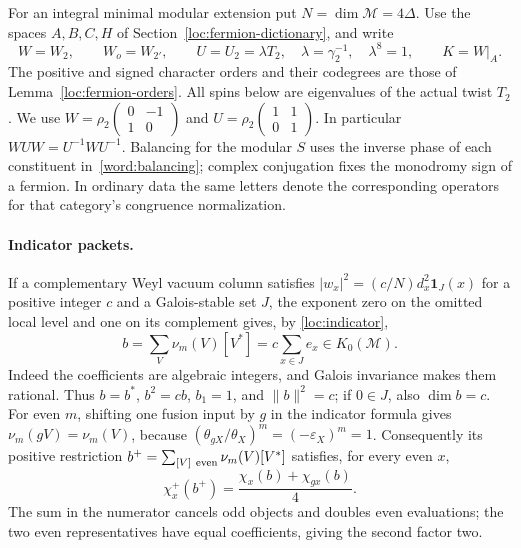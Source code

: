 \documentclass[11pt,a4paper]{article}
\numberwithin{equation}{section}
\begin{document}
For an integral minimal modular extension put $N=\dim\mathcal M=4\Delta$.
Use the spaces $A,B,C,H$ of Section~\ref{loc:fermion-dictionary}, and write
\[
 W=W_2,\qquad W_o=W_{2'},\qquad
 U=U_2=\lambda T_2,\quad\lambda=\gamma_2^{-1},\quad\lambda^8=1,
 \qquad K=W|_A.
\]
The positive and signed character orders and their codegrees are those
of Lemma~\ref{loc:fermion-orders}. All spins below are eigenvalues of the
actual twist $T_2$. We use $W=\rho_2(\begin{smallmatrix}0&-1\\1&0\end{smallmatrix})$
and $U=\rho_2(\begin{smallmatrix}1&1\\0&1\end{smallmatrix})$.
In particular $WUW=U^{-1}WU^{-1}$. Balancing for the modular $S$ uses
the inverse phase of each constituent in~\eqref{word:balancing};
complex conjugation fixes the monodromy sign of a fermion.
In ordinary data the same letters denote the corresponding operators
for that category's congruence normalization.

\paragraph{Indicator packets.}
If a complementary Weyl vacuum column satisfies
$|w_x|^2=(c/N)d_x^2\mathbf1_J(x)$ for a positive integer $c$
and a Galois-stable set $J$,
the exponent zero on the omitted local level and one on its
complement gives, by \eqref{loc:indicator},
\[
 b=\sum_V\nu_m(V)[V^*]=c\sum_{x\in J}e_x\in K_0(\mathcal M).
\]
Indeed the coefficients are algebraic integers, and Galois invariance
makes them rational. Thus $b=b^*$, $b^2=cb$, $b_1=1$, and
$\|b\|^2=c$; if $0\in J$, also $\dim b=c$.
For even $m$, shifting one fusion input by $g$ in the indicator
formula gives $\nu_m(gV)=\nu_m(V)$, because
$(\theta_{gX}/\theta_X)^m=(-\varepsilon_X)^m=1$.
Consequently its positive restriction
$b^+=\sum_{[V]\ {\rm even}}\nu_m(V)[V^*]$ satisfies, for every even $x$,
\begin{equation}\label{red:indicator-positive}
       \chi_x^+(b^+)=\frac{\chi_x(b)+\chi_{gx}(b)}4.
\end{equation}
The sum in the numerator cancels odd objects and doubles even
evaluations; the two even representatives have equal coefficients,
giving the second factor two.
\end{document}
